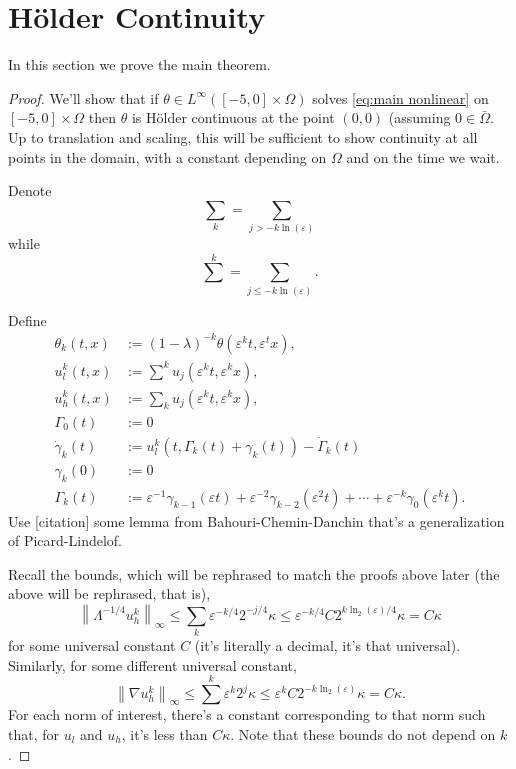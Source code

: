 \documentclass[11pt]{amsart}
\theoremstyle{remark}
\theoremstyle{definition}
\newcommand{\eps}{\varepsilon}
\newcommand{\norm}[1]{\left\lVert#1\right\rVert}
\newcommand{\grad}{\nabla}
\newcommand{\n}{^{-1}}
\newcommand{\ulow}{u_l}
\newcommand{\uhigh}{u_h}
\newcommand{\ulowth}[1]{\ulow^{#1}}
\newcommand{\uhighth}[1]{\uhigh^{#1}}
\begin{document}

\section{H\"{o}lder Continuity} \label{sec:holder}

In this section we prove the main theorem.  

\begin{proof}
We'll show that if $\theta \in L^\infty([-5,0] \times \Omega)$ solves \eqref{eq:main nonlinear} on $[-5,0]\times \Omega$ then $\theta$ is H\"{o}lder continuous at the point $(0,0)$ (assuming $0 \in \bar{\Omega}$.  Up to translation and scaling, this will be sufficient to show continuity at all points in the domain, with a constant depending on $\Omega$ and on the time we wait.  

Denote
\[ \sum_k = \sum_{j > - k \ln(\eps)} \]
while
\[ \sum^k = \sum_{j \leq -k \ln(\eps)}. \]

Define
\begin{align*} 
\theta_k(t,x) &:= (1-\lambda)^{-k} \theta(\eps^k t, \eps^t x), \\
\ulowth{k}(t,x) &:= \sum^k u_j(\eps^k t, \eps^k x), \\
\uhighth{k}(t,x) &:= \sum_k u_j(\eps^k t, \eps^k x), \\
\Gamma_0(t) &:= 0 \\
\dot{\gamma}_k(t) &:= \ulowth{k}(t, \Gamma_k(t) + \gamma_k(t)) - \dot{\Gamma}_k(t) \\
\gamma_k(0) &:= 0 \\
\Gamma_k(t) &:= \eps\n \gamma_{k-1}(\eps t) + \eps^{-2} \gamma_{k-2}(\eps^2 t) + \cdots + \eps^{-k} \gamma_0(\eps^k t). 
\end{align*}
Use [citation] some lemma from Bahouri-Chemin-Danchin that's a generalization of Picard-Lindelof.  

Recall the bounds, which will be rephrased to match the proofs above later (the above will be rephrased, that is),
\[ \norm{\Lambda^{-1/4} \uhighth{k} }_\infty \leq \sum_k \eps^{-k/4} 2^{-j/4} \kappa \leq \eps^{-k/4} C 2^{k \ln_2(\eps) /4} \kappa = C \kappa \]
for some universal constant $C$ (it's literally a decimal, it's that universal).  Similarly, for some different universal constant,
\[ \norm{\grad \uhighth{k} }_\infty \leq \sum^k \eps^{k} 2^{j} \kappa \leq \eps^{k} C 2^{-k \ln_2(\eps)} \kappa = C \kappa. \]
For each norm of interest, there's a constant corresponding to that norm such that, for $\ulow$ and $\uhigh$, it's less than $C \kappa$.  Note that these bounds do not depend on $k$.  


\end{proof}
\end{document}
